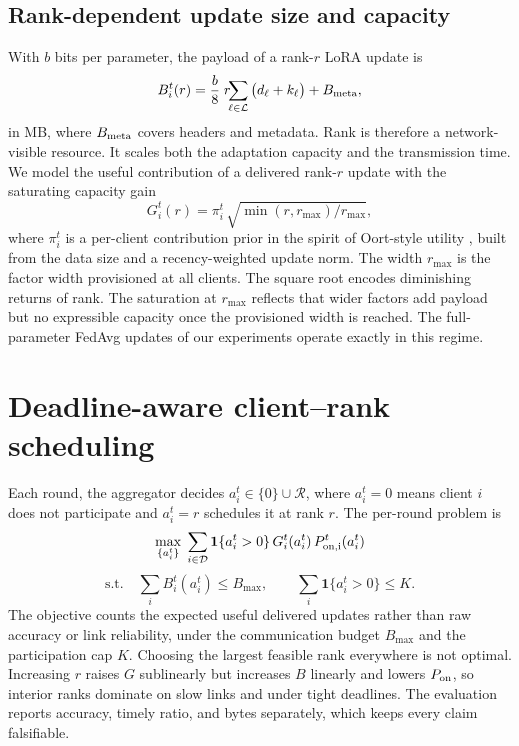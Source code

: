 \documentclass[preprint,12pt]{elsarticle}
\begin{document}
\subsection{Rank-dependent update size and capacity}
With $b$ bits per parameter, the payload of a rank-$r$ LoRA update is
\begin{equation}
B_i^t(r)=\frac{b}{8}\;r\!\!\sum_{\ell\in\mathcal L}\big(d_\ell+k_\ell\big)+B_{\rm meta},
\label{eq:size}
\end{equation}
in MB, where $B_{\rm meta}$ covers headers and metadata. Rank is therefore a network-visible resource. It scales both the adaptation capacity and the transmission time. We model the useful contribution of a delivered rank-$r$ update with the saturating capacity gain
\begin{equation}
G_i^t(r)=\pi_i^t\,\sqrt{\min(r,r_{\max})/r_{\max}},
\label{eq:cap}
\end{equation}
where $\pi_i^t$ is a per-client contribution prior in the spirit of Oort-style utility \cite{oort2021oort}, built from the data size and a recency-weighted update norm. The width $r_{\max}$ is the factor width provisioned at all clients. The square root encodes diminishing returns of rank. The saturation at $r_{\max}$ reflects that wider factors add payload but no expressible capacity once the provisioned width is reached. The full-parameter FedAvg updates of our experiments operate exactly in this regime.

\section{Deadline-aware client--rank scheduling}
\label{sec:problem}

Each round, the aggregator decides $a_i^t\in\{0\}\cup\mathcal R$, where $a_i^t=0$ means client $i$ does not participate and $a_i^t=r$ schedules it at rank $r$. The per-round problem is
\begin{equation}
\max_{\{a_i^t\}}\;\sum_{i\in\mathcal D}\mathbf 1\{a_i^t>0\}\,G_i^t(a_i^t)\,P_{\rm on,i}^t(a_i^t)
\label{eq:objective}
\end{equation}
\begin{equation}
\text{s.t.}\quad \sum_i B_i^t(a_i^t)\le B_{\max},\qquad \sum_i\mathbf 1\{a_i^t>0\}\le K .
\label{eq:constraints}
\end{equation}
The objective counts the expected useful delivered updates rather than raw accuracy or link reliability, under the communication budget $B_{\max}$ and the participation cap $K$. Choosing the largest feasible rank everywhere is not optimal. Increasing $r$ raises $G$ sublinearly but increases $B$ linearly and lowers $P_{\rm on}$, so interior ranks dominate on slow links and under tight deadlines. The evaluation reports accuracy, timely ratio, and bytes separately, which keeps every claim falsifiable.
\end{document}
